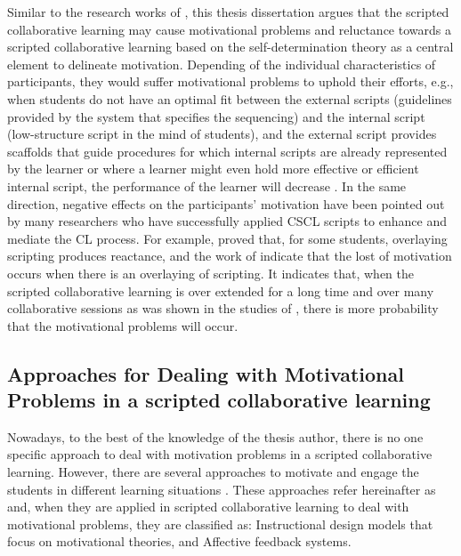 Similar to the research works of , this thesis dissertation argues that the scripted collaborative learning may cause motivational problems and reluctance towards a scripted collaborative learning based on the self-determination theory \cite{DeciRyan2010} as a central element to delineate motivation.
Depending of the individual characteristics of participants, they would suffer motivational problems to uphold their efforts, e.g., when students do not have an optimal fit between the external scripts (guidelines provided by the system that specifies the sequencing) and the internal script (low-structure script in the mind of students), and the external script provides scaffolds that guide procedures for which internal scripts are already represented by the learner or where a learner might even hold more effective or efficient internal script, the performance of the learner will decrease \cite{StegmannMuGehlen-BaumFischer2011}.
In the same direction, negative effects on the participants' motivation have been pointed out by many researchers who have successfully applied CSCL scripts to enhance and mediate the CL process.
For example,  proved  that, for some students, overlaying scripting produces reactance, and the work of indicate that the lost of motivation occurs when there is an overlaying of scripting.
It indicates that, when the scripted collaborative learning is over extended for a long time and over many collaborative sessions as was shown in the studies of , there is more probability that the motivational problems will occur.



\subsection{Approaches for Dealing with Motivational Problems in a scripted collaborative learning}

Nowadays, to the best of the knowledge of the thesis author, there is no one specific approach to deal with motivation problems in a scripted collaborative learning.
However, there are several approaches to motivate and engage the students in different learning situations \cite{Hardre2003,ReigeluthKrathwohlCarr-Chellman1983,Spitzer1996}.
These approaches refer hereinafter as  and, when they are applied in scripted collaborative learning to deal with motivational problems, they are classified as:
Instructional design models that focus on motivational theories, and Affective feedback systems.  


